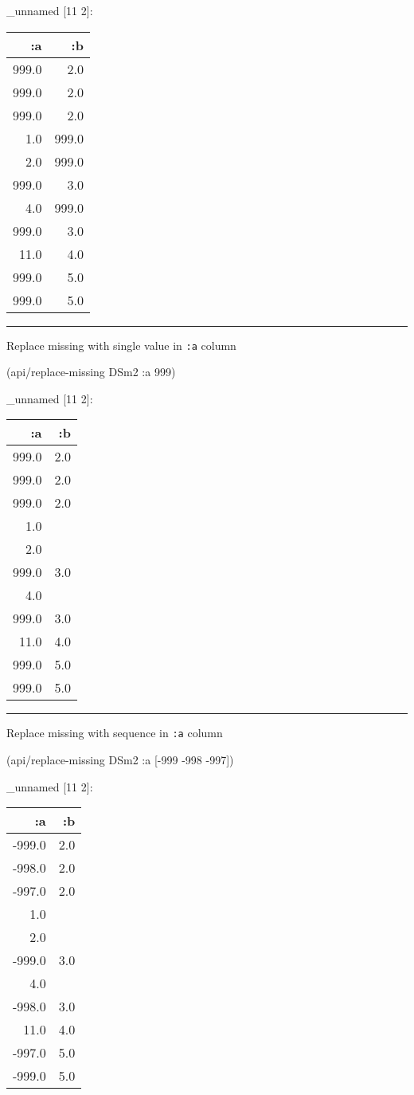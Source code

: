 \documentclass[]{article}
\newenvironment{Shaded}{\begin{snugshade}}{\end{snugshade}}
\newcommand{\DecValTok}[1]{\textcolor[rgb]{0.00,0.00,0.81}{#1}}
\newcommand{\AttributeTok}[1]{\textcolor[rgb]{0.77,0.63,0.00}{#1}}
\newcommand{\NormalTok}[1]{#1}
\begin{document}
\_unnamed {[}11 2{]}:

\begin{longtable}[]{@{}rr@{}}
\toprule
:a & :b\tabularnewline
\midrule
\endhead
999.0 & 2.0\tabularnewline
999.0 & 2.0\tabularnewline
999.0 & 2.0\tabularnewline
1.0 & 999.0\tabularnewline
2.0 & 999.0\tabularnewline
999.0 & 3.0\tabularnewline
4.0 & 999.0\tabularnewline
999.0 & 3.0\tabularnewline
11.0 & 4.0\tabularnewline
999.0 & 5.0\tabularnewline
999.0 & 5.0\tabularnewline
\bottomrule
\end{longtable}

\begin{center}\rule{0.5\linewidth}{0.5pt}\end{center}

Replace missing with single value in \texttt{:a} column

\begin{Shaded}
\begin{Highlighting}[]
\NormalTok{(api/replace-missing DSm2 }\AttributeTok{:a} \DecValTok{999}\NormalTok{)}
\end{Highlighting}
\end{Shaded}

\_unnamed {[}11 2{]}:

\begin{longtable}[]{@{}rr@{}}
\toprule
:a & :b\tabularnewline
\midrule
\endhead
999.0 & 2.0\tabularnewline
999.0 & 2.0\tabularnewline
999.0 & 2.0\tabularnewline
1.0 &\tabularnewline
2.0 &\tabularnewline
999.0 & 3.0\tabularnewline
4.0 &\tabularnewline
999.0 & 3.0\tabularnewline
11.0 & 4.0\tabularnewline
999.0 & 5.0\tabularnewline
999.0 & 5.0\tabularnewline
\bottomrule
\end{longtable}

\begin{center}\rule{0.5\linewidth}{0.5pt}\end{center}

Replace missing with sequence in \texttt{:a} column

\begin{Shaded}
\begin{Highlighting}[]
\NormalTok{(api/replace-missing DSm2 }\AttributeTok{:a}\NormalTok{ [-}\DecValTok{999} \DecValTok{-998} \DecValTok{-997}\NormalTok{])}
\end{Highlighting}
\end{Shaded}

\_unnamed {[}11 2{]}:

\begin{longtable}[]{@{}rr@{}}
\toprule
:a & :b\tabularnewline
\midrule
\endhead
-999.0 & 2.0\tabularnewline
-998.0 & 2.0\tabularnewline
-997.0 & 2.0\tabularnewline
1.0 &\tabularnewline
2.0 &\tabularnewline
-999.0 & 3.0\tabularnewline
4.0 &\tabularnewline
-998.0 & 3.0\tabularnewline
11.0 & 4.0\tabularnewline
-997.0 & 5.0\tabularnewline
-999.0 & 5.0\tabularnewline
\bottomrule
\end{longtable}
\end{document}
